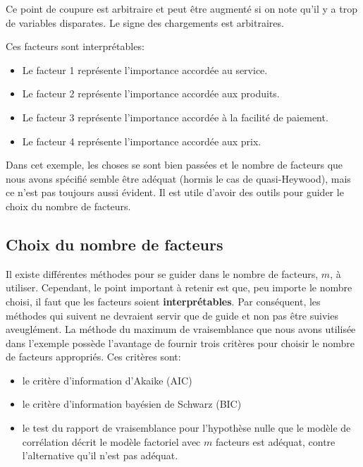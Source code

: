 \documentclass[
  11pt,
  letterpaper,
]{book}
\providecommand{\tightlist}{%
  \setlength{\itemsep}{0pt}\setlength{\parskip}{0pt}}\usepackage{longtable,booktabs,array}
\theoremstyle{definition}
\theoremstyle{remark}
\begin{document}
Ce point de coupure est arbitraire et peut être augmenté si on note
qu'il y a trop de variables disparates. Le signe des chargements est
arbitraires.

Ces facteurs sont interprétables:

\begin{itemize}
\tightlist
\item
  Le facteur 1 représente l'importance accordée au service.
\item
  Le facteur 2 représente l'importance accordée aux produits.
\item
  Le facteur 3 représente l'importance accordée à la facilité de
  paiement.
\item
  Le facteur 4 représente l'importance accordée aux prix.
\end{itemize}

Dans cet exemple, les choses se sont bien passées et le nombre de
facteurs que nous avons spécifié semble être adéquat (hormis le cas de
quasi-Heywood), mais ce n'est pas toujours aussi évident. Il est utile
d'avoir des outils pour guider le choix du nombre de facteurs.

\hypertarget{choix-du-nombre-de-facteurs}{%
\subsection{Choix du nombre de
facteurs}\label{choix-du-nombre-de-facteurs}}

Il existe différentes méthodes pour se guider dans le nombre de
facteurs, \(m\), à utiliser. Cependant, le point important à retenir est
que, peu importe le nombre choisi, il faut que les facteurs soient
\textbf{interprétables}. Par conséquent, les méthodes qui suivent ne
devraient servir que de guide et non pas être suivies aveuglément. La
méthode du maximum de vraisemblance que nous avons utilisée dans
l'exemple possède l'avantage de fournir trois critères pour choisir le
nombre de facteurs appropriés. Ces critères sont:

\begin{itemize}
\tightlist
\item
  le critère d'information d'Akaike (AIC)
\item
  le critère d'information bayésien de Schwarz (BIC)
\item
  le test du rapport de vraisemblance pour l'hypothèse nulle que le
  modèle de corrélation décrit le modèle factoriel avec \(m\) facteurs
  est adéquat, contre l'alternative qu'il n'est pas adéquat.
\end{itemize}
\end{document}
